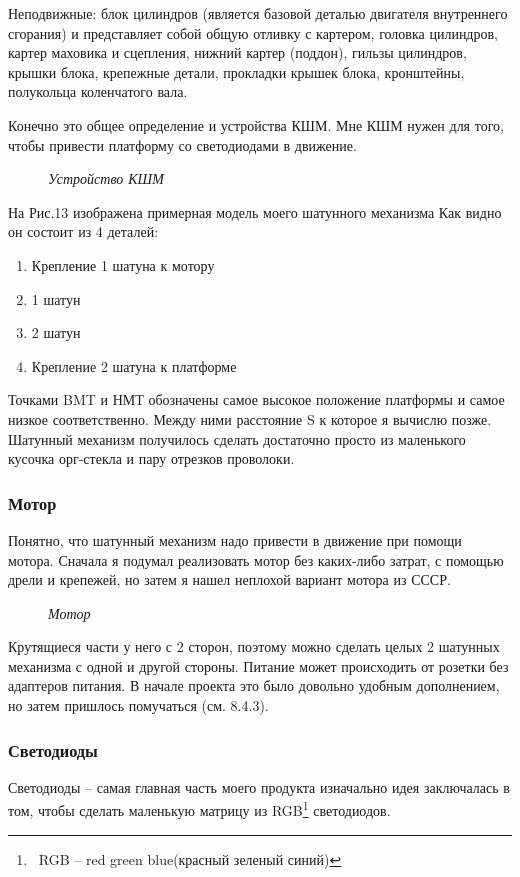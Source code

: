 \documentclass[a4paper, 12pt]{article}
\newcommand{\image}[3]{
	\begin{figure}[ht]
		\center{\texttt{[image: img/\#1]} }
		\caption{\textit{#3}}\end{figure}
}
\begin{document}
Неподвижные: блок цилиндров (является базовой деталью двигателя
внутреннего сгорания) и представляет собой общую отливку с картером,
головка цилиндров, картер маховика и сцепления, нижний картер (поддон),
гильзы цилиндров, крышки блока, крепежные детали, прокладки крышек
блока, кронштейны, полукольца коленчатого вала.

Конечно это общее определение и устройства КШМ. Мне КШМ нужен для того,
чтобы привести платформу со светодиодами в движение.

\image{Шатун.png}{350}{Устройство КШМ}

\newpage

На Рис.13 изображена примерная модель моего шатунного механизма
Как видно он состоит из 4 деталей:
\begin{enumerate}
	\item Крепление 1 шатуна к мотору
	\item 1 шатун
	\item 2 шатун
	\item Крепление 2 шатуна к платформе
\end{enumerate}
Точками BMT и НМТ обозначены самое высокое
положение платформы и самое низкое соответственно.
Между ними расстояние S к которое я вычислю позже.
Шатунный механизм получилось сделать достаточно просто
из маленького кусочка орг-стекла и пару отрезков проволоки.

\subsubsection{Мотор}

Понятно, что шатунный механизм надо привести в движение
при помощи мотора.
Сначала я подумал реализовать мотор без каких-либо затрат,
с помощью дрели и крепежей, но затем я нашел неплохой вариант
мотора из СССР.

\image{Мотор.jpg}{160}{Мотор}

Крутящиеся части у него с 2 сторон, поэтому можно сделать целых 2 шатунных механизма
с одной и другой стороны. Питание может происходить от розетки без адаптеров питания.
В начале проекта это было довольно удобным дополнением, но затем пришлось помучаться
(см. 8.4.3).

\subsubsection{Светодиоды}

Светодиоды -- самая главная часть моего продукта
изначально идея заключалась в том, чтобы сделать маленькую
матрицу из RGB\footnote{\ RGB -- red green blue(красный зеленый синий)} светодиодов.
\end{document}
